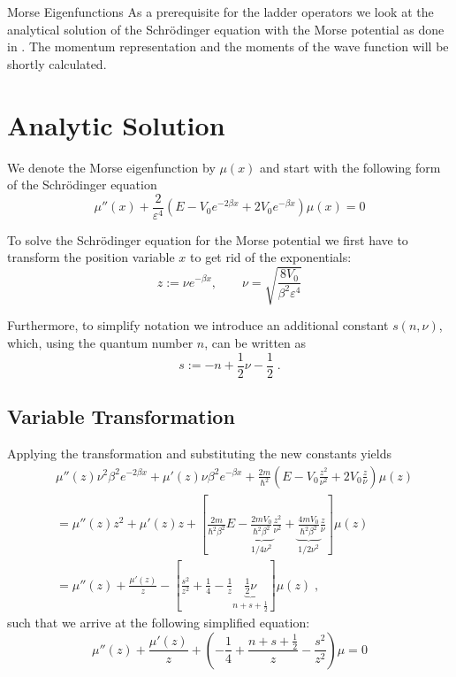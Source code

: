 \begin{chapter}{Morse Eigenfunctions}
As a prerequisite for the ladder operators we look at the analytical solution of the Schrödinger equation with the Morse potential
as done in \cite{Landau1981Quantum}. The momentum representation and the moments of the wave function will be shortly calculated.

\section{Analytic Solution} %
\label{sec:Analytic Solution}
We denote the Morse eigenfunction by $\mu(x)$ and start with the following form of the Schrödinger equation
\begin{equation}
    \mu''(x)+\frac{2}{\varepsilon^4}( E-V_0e^{-2\beta x}+2V_0e^{-\beta x} )\mu(x)=0
\end{equation}

To solve the Schrödinger equation for the Morse potential we first have to transform the  position variable $x$ to get rid of the exponentials:
\begin{equation}
    \label{eq:morse_var_transform}
    z:=\nu e^{-\beta x},\qquad \nu=\sqrt{\frac{8V_0}{\beta^2\varepsilon^4}}
\end{equation}

Furthermore, to simplify notation we introduce an additional constant $s(n,\nu)$, which, using the quantum number $n$, can be written as
\begin{equation}
    \label{eq:const_rel}
    s:=-n+\frac{1}{2}\nu-\frac{1}{2}\; .
\end{equation}

\subsection{Variable Transformation}
Applying the transformation and substituting the new constants yields
\begin{align}
    &\mu''(z)\nu^2\beta^2e^{-2\beta x}+\mu'(z)\nu\beta^2e^{-\beta x}+\frac{2m}{\hbar^2}\left(E-V_0\frac{z^2}{\nu^2}+2V_0\frac{z}{\nu}\right)\mu(z)\\
    &=\mu''(z)z^2+\mu'(z)z+\left[\frac{2m}{\hbar^2\beta^2}E-\underbrace{\frac{2mV_0}{\hbar^2\beta^2}}_{1/4 \nu^2}\frac{z^2}{\nu^2}
	+\underbrace{\frac{4mV_0}{\hbar^2\beta^2}}_{1/2\nu^2}\frac{z}{\nu}\right]\mu(z)\\
    &=\mu''(z)+\frac{\mu'(z)}{z}-\left[\frac{s^2}{z^2}+\frac{1}{4}-\frac{1}{z}\underbrace{\frac{1}{2}\nu}_{n+s+\frac{1}{2}} \right]
    \mu(z)\;,
\end{align}
such that we arrive at the following simplified equation:
\begin{equation}
	\label{eq:morse_transformed_tdse}
	\mu''(z)+\frac{\mu'(z)}{z}+\left( -\frac{1}{4}+\frac{n+s+\frac{1}{2}}{z}-\frac{s^2}{z^2}\right)\mu=0
\end{equation}



\end{chapter}
